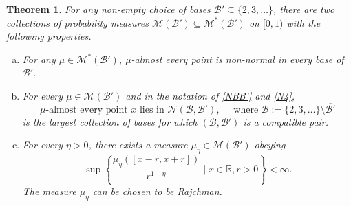 \documentclass[12pt, twoside]{article}
\newtheorem{theorem}{Theorem}[section]
\theoremstyle{definition}
\numberwithin{equation}{section}
\begin{document}
\begin{theorem} \label{mainthm-2} 
For any non-empty choice of bases $\mathscr{B}' \subseteq \{2, 3, \ldots\}$, there are two collections of probability measures $\mathscr{M}(\mathscr{B}') \subseteq \mathscr{M}^{\ast}(\mathscr{B}')$ on $[0, 1)$ with the following properties. 
\begin{enumerate}[(a)] 
\item For any $\mu \in \mathscr{M}^{\ast}(\mathscr{B}')$, $\mu$-almost every point is non-normal in every base of $\mathscr{B}'$. \label{mainthm-2-parta}
\item For every $\mu \in \mathscr{M}(\mathscr{B}')$ and in the notation of \eqref{NBB'} and \eqref{N4}, 
\begin{equation} \text{$\mu$-almost every point $x$ lies in } \mathscr N(\mathscr{B}, \mathscr{B}'), \quad \text{ where } \mathscr{B} := \{2, 3, \ldots \} \setminus \overline{\mathscr{B}'} \label{normality-seeking-def} \end{equation}   
is the largest collection of bases for which $(\mathscr{B}, \mathscr{B}')$ is a compatible pair. \label{mainthm-2-partb} 
\item For every $\eta > 0$, there exists a measure $\mu_{\eta} \in \mathscr{M}(\mathscr{B}')$ obeying 
 \begin{equation} \label{Frostman-condition} 
 \sup \left\{\frac{\mu_{\eta}([x-r, x+r])}{r^{1 -\eta}} \; \Biggl| \; x \in \mathbb R, r > 0 \right\} < \infty. 
 \end{equation} 
The measure $\mu_{\eta}$ can be chosen to be Rajchman.  \label{mainthm-2-partc} 
 \end{enumerate} 
\end{theorem}  
\end{document}
